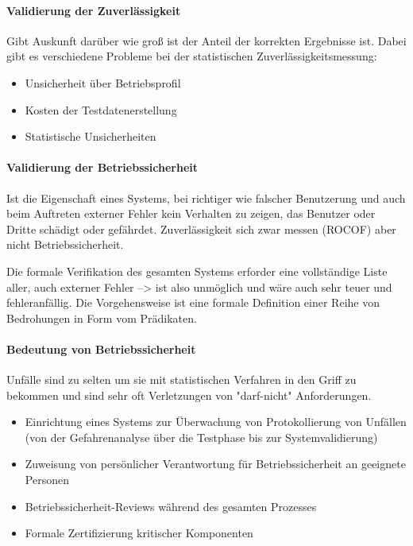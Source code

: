 \paragraph{Validierung der Zuverlässigkeit}
Gibt Auskunft darüber wie groß ist der Anteil der korrekten Ergebnisse ist.
Dabei gibt es verschiedene Probleme bei der statistischen Zuverlässigkeitsmessung:

\begin{itemize}
\item Unsicherheit über Betriebsprofil
\item Kosten der Testdatenerstellung
\item Statistische Unsicherheiten
\end{itemize}

\paragraph{Validierung der Betriebssicherheit}
Ist die Eigenschaft eines Systems, bei richtiger wie falscher Benutzerung und auch beim Auftreten externer Fehler kein Verhalten zu zeigen, das Benutzer oder Dritte schädigt oder gefährdet.
Zuverlässigkeit sich zwar messen (ROCOF) aber nicht Betriebssicherheit. 

Die formale Verifikation des gesamten Systems erforder eine vollständige Liste aller, auch externer Fehler --> ist also unmöglich und wäre auch sehr teuer und fehleranfällig. Die Vorgehensweise ist eine formale Definition einer Reihe von Bedrohungen in Form vom Prädikaten. 

\paragraph{Bedeutung von Betriebssicherheit}
Unfälle sind zu selten um sie mit statistischen Verfahren in den Griff zu bekommen und sind sehr oft Verletzungen von "darf-nicht" Anforderungen.

\begin{itemize}
\item Einrichtung eines Systems zur Überwachung von Protokollierung von Unfällen (von der Gefahrenanalyse über die Testphase bis zur Systemvalidierung)
\item Zuweisung von persönlicher Verantwortung für Betriebssicherheit an geeignete Personen
\item Betriebssicherheit-Reviews während des gesamten Prozesses
\item Formale Zertifizierung kritischer Komponenten
\end{itemize}

